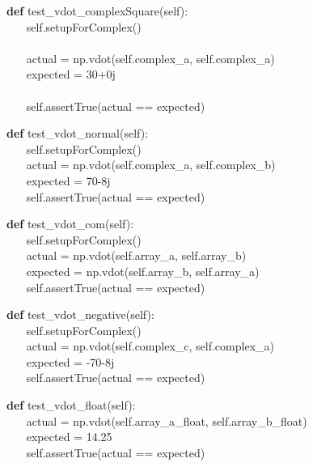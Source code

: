 \begin{algorithm}[H]
	\textbf{def} test\_vdot\_complexSquare(self):
	\\ $ ~~~~~~~~ $self.setupForComplex()
	\\
	\\ $ ~~~~~~~~ $actual = np.vdot(self.complex\_a, self.complex\_a)
	\\ $ ~~~~~~~~ $expected = 30+0j
	\\
	\\ $ ~~~~~~~~ $self.assertTrue(actual == expected)
\end{algorithm}

\begin{algorithm}[H]
    \textbf{def} test\_vdot\_normal(self):
\\ $ ~~~~~~~~ $self.setupForComplex()
\\ $ ~~~~~~~~ $actual = np.vdot(self.complex\_a, self.complex\_b)
\\ $ ~~~~~~~~ $expected = 70-8j
\\ $ ~~~~~~~~ $self.assertTrue(actual == expected)
\end{algorithm}

\begin{algorithm}[H]
    \textbf{def} test\_vdot\_com(self):
\\ $ ~~~~~~~~ $self.setupForComplex()
\\ $ ~~~~~~~~ $actual = np.vdot(self.array\_a, self.array\_b)
\\ $ ~~~~~~~~ $expected = np.vdot(self.array\_b, self.array\_a)
\\ $ ~~~~~~~~ $self.assertTrue(actual == expected)
\end{algorithm}

\begin{algorithm}[H]
    \textbf{def} test\_vdot\_negative(self):
\\ $ ~~~~~~~~ $self.setupForComplex()
\\ $ ~~~~~~~~ $actual = np.vdot(self.complex\_c, self.complex\_a)
\\ $ ~~~~~~~~ $expected = -70-8j
\\ $ ~~~~~~~~ $self.assertTrue(actual == expected)
\end{algorithm}

\begin{algorithm}[H]
    \textbf{def} test\_vdot\_float(self):
\\ $ ~~~~~~~~ $actual = np.vdot(self.array\_a\_float, self.array\_b\_float)
\\ $ ~~~~~~~~ $expected = 14.25
\\ $ ~~~~~~~~ $self.assertTrue(actual == expected)
\end{algorithm}

